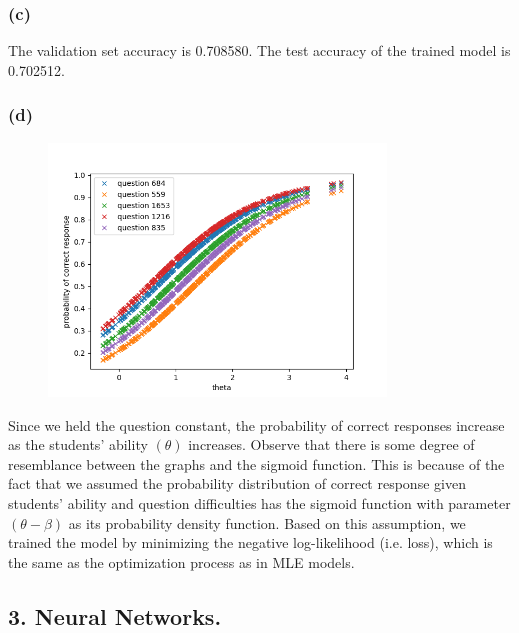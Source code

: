\documentclass{article}
\begin{document}
\begin{spacing}{1.5}
\subsubsection*{(c)}
The validation set accuracy is 0.708580. The test accuracy of the trained model is 0.702512.
\subsubsection*{(d)}
\begin{figure}[htbp]
	\includegraphics[width=0.8\textwidth]{irt_correctness_probability_with_theta.png}
\end{figure}
Since we held the question constant, the probability of correct responses increase as the students’ ability $(\theta)$ increases. Observe that there is some degree of resemblance between the graphs and the sigmoid function. 
This is because of the fact that we assumed the probability distribution of correct response given students’ ability and question difficulties has the sigmoid function 
with parameter $(\theta - \beta)$ as its probability density function. Based on this assumption, we trained the model by minimizing the negative log-likelihood (i.e. loss), which is the same as the 
optimization process as in MLE models.
\subsection*{3. Neural Networks.}

\end{spacing}
\end{document}
